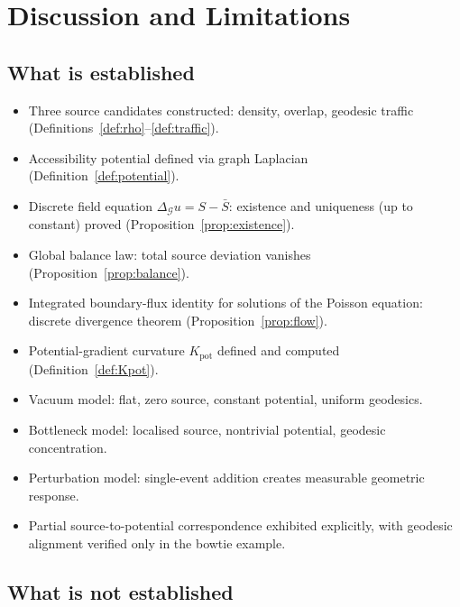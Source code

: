 \documentclass[12pt]{article}
\newcommand{\Gcal}{\mathcal{G}}
\begin{document}
\section{Discussion and Limitations}\label{sec:discussion}

\subsection{What is established}

\begin{itemize}
    \item Three source candidates constructed: density, overlap, geodesic traffic (Definitions~\ref{def:rho}--\ref{def:traffic}).
    \item Accessibility potential defined via graph Laplacian (Definition~\ref{def:potential}).
    \item Discrete field equation $\Delta_\Gcal u = S - \bar{S}$: existence and uniqueness (up to constant) proved (Proposition~\ref{prop:existence}).
    \item Global balance law: total source deviation vanishes (Proposition~\ref{prop:balance}).
    \item Integrated boundary-flux identity for solutions of the Poisson equation: discrete divergence theorem (Proposition~\ref{prop:flow}).
    \item Potential-gradient curvature $K_{\mathrm{pot}}$ defined and computed (Definition~\ref{def:Kpot}).
    \item Vacuum model: flat, zero source, constant potential, uniform geodesics.
    \item Bottleneck model: localised source, nontrivial potential, geodesic concentration.
    \item Perturbation model: single-event addition creates measurable geometric response.
    \item Partial source-to-potential correspondence exhibited explicitly, with geodesic alignment verified only in the bowtie example.
\end{itemize}

\subsection{What is not established}
\end{document}
